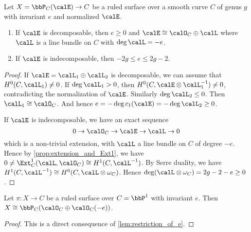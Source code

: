     \begin{lemma}\label{lem:restriction_of_e}
        Let \(X=\bbP_C(\calE) \to C\) be a ruled surface over a smooth curve \(C\) of genus \(g\) with invariant \(e\) and normalized \(\calE\). 
        \begin{enumerate}
            \item If \(\calE\) is decomposable, then \(e \geq 0\) and \(\calE \cong \calO_C \oplus \calL\) where \(\calL\) is a line bundle on \(C\) with \(\deg \calL = -e\).
            \item If \(\calE\) is indecomposable, then \(-2g \leq e \leq 2g - 2\).
        \end{enumerate} 
    \end{lemma}
    \begin{proof}
        If \(\calE = \calL_1 \oplus \calL_2\) is decomposable, we can assume that \(H^0(C,\calL_1) \neq 0\).
        If \(\deg \calL_1 > 0\), then \(H^0(C,\calE \otimes \calL_1^{-1}) \neq 0\), contradicting the normalization of \(\calE\).
        Similarly \(\deg \calL_2 \leq 0\).
        Then \(\calL_1 \cong \calO_C\).
        And hence \(e = -\deg c_1(\calE) = -\deg \calL_2 \geq 0\).

        If \(\calE\) is indecomposable, we have an exact sequence
        \[ 0 \to \calO_C \to \calE \to \calL \to 0 \]
        which is a non-trivial extension, with \(\calL\) a line bundle on \(C\) of degree \(-e\).
        Hence by \cref{prop:extension_and_Ext1}, we have \(0 \neq \Ext^1_C(\calL,\calO_C) \cong H^1(C,\calL^{-1})\).
        By Serre duality, we have \(H^1(C,\calL^{-1}) \cong H^0(C,\calL \otimes \omega_C)\).
        Hence \(\deg(\calL \otimes \omega_C) = 2g - 2 - e \geq 0\).

    \end{proof}

    \begin{theorem}\label{thm:classification_of_ruled_surface_on_P1}
        Let \(\pi:X \to C\) be a ruled surface over \(C = \bbP^1\) with invariant \(e\).
        Then \(X \cong \bbP_{C}(\calO_C \oplus \calO_C(-e))\).
    \end{theorem}
    \begin{proof}
        This is a direct consequence of \cref{lem:restriction_of_e}.
    \end{proof}

